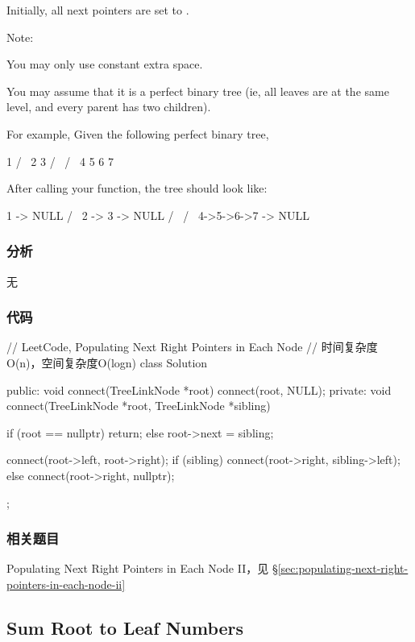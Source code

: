 Initially, all next pointers are set to .

Note:
\begindot
\item You may only use constant extra space.
\item You may assume that it is a perfect binary tree (ie, all leaves are at the same level, and every parent has two children).
\myenddot

For example,
Given the following perfect binary tree,
\begin{Code}
         1
       /  \
      2    3
     / \  / \
    4  5  6  7
\end{Code}

After calling your function, the tree should look like:
\begin{Code}
         1 -> NULL
       /  \
      2 -> 3 -> NULL
     / \  / \
    4->5->6->7 -> NULL
\end{Code}


\subsubsection{分析}
无

\subsubsection{代码}

\begin{Code}
// LeetCode, Populating Next Right Pointers in Each Node
// 时间复杂度O(n)，空间复杂度O(logn)
class Solution {
public:
    void connect(TreeLinkNode *root) {
        connect(root, NULL);
    }
private:
    void connect(TreeLinkNode *root, TreeLinkNode *sibling) {
        if (root == nullptr)
            return;
        else
            root->next = sibling;

        connect(root->left, root->right);
        if (sibling)
            connect(root->right, sibling->left);
        else
            connect(root->right, nullptr);
    }
};
\end{Code}


\subsubsection{相关题目}
\begindot
\item Populating Next Right Pointers in Each Node II，见 \S \ref{sec:populating-next-right-pointers-in-each-node-ii}
\myenddot


\subsection{Sum Root to Leaf Numbers} %
\label{sec:sum-root-to-leaf-numbers}


